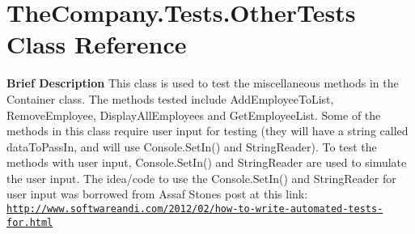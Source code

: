 \hypertarget{class_the_company_1_1_tests_1_1_other_tests}{}\section{The\+Company.\+Tests.\+Other\+Tests Class Reference}
\label{class_the_company_1_1_tests_1_1_other_tests}


{\bfseries  Brief Description} This class is used to test the miscellaneous methods in the Container class. The methods tested include Add\+Employee\+To\+List, Remove\+Employee, Display\+All\+Employees and Get\+Employee\+List. Some of the methods in this class require user input for testing (they will have a string called data\+To\+Pass\+In, and will use Console.\+Set\+In() and String\+Reader). To test the methods with user input, Console.\+Set\+In() and String\+Reader are used to simulate the user input. The idea/code to use the Console.\+Set\+In() and String\+Reader for user input was borrowed from Assaf Stone\textquotesingle{}s post at this link\+: \href{http://www.softwareandi.com/2012/02/how-to-write-automated-tests-for.html}{\tt http\+://www.\+softwareandi.\+com/2012/02/how-\/to-\/write-\/automated-\/tests-\/for.\+html}  


